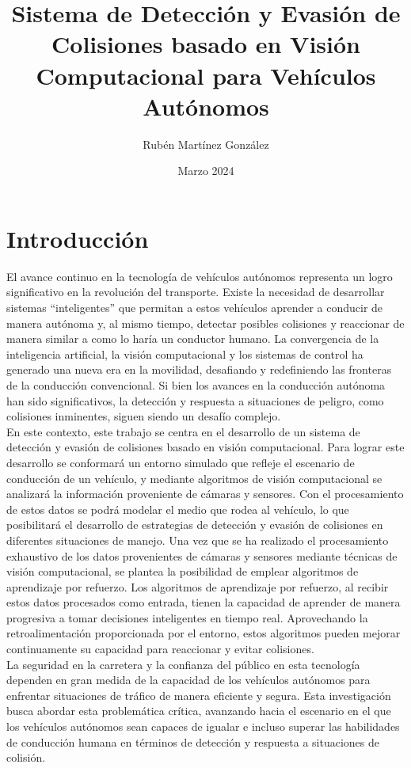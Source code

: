 \documentclass[12pt,letterpaper,final]{article}
\title{Sistema de Detección y Evasión de Colisiones basado en Visión Computacional para Vehículos Autónomos}
\author{Rubén Martínez González}
\date{Marzo 2024}
\begin{document}
    \maketitle
    \clearpage

    \section*{Introducción}
    \noindent
    El avance continuo en la tecnología de vehículos autónomos representa un logro significativo en la revolución del transporte.
    Existe la necesidad de desarrollar sistemas ``inteligentes'' que permitan a estos vehículos aprender a conducir de manera autónoma y,
    al mismo tiempo, detectar posibles colisiones y reaccionar de manera similar a como lo haría un conductor humano.
    La convergencia de la inteligencia artificial, la visión computacional y los sistemas de control ha generado una nueva era en la movilidad,
    desafiando y redefiniendo las fronteras de la conducción convencional.
    Si bien los avances en la conducción autónoma han sido significativos, la detección y respuesta a
    situaciones de peligro, como colisiones inminentes, siguen siendo un desafío complejo.\\ \newline
    En este contexto, este trabajo se centra en el desarrollo de un sistema de detección y evasión de colisiones basado en visión computacional.
    Para lograr este desarrollo se conformará un entorno simulado que refleje el escenario de conducción de un vehículo,
    y mediante algoritmos de visión computacional se analizará la información proveniente de cámaras y sensores.
    Con el procesamiento de estos datos se podrá modelar el medio que rodea al vehículo, lo que posibilitará
    el desarrollo de estrategias de detección y evasión de colisiones en diferentes situaciones de manejo.
    Una vez que se ha realizado el procesamiento exhaustivo de los datos provenientes de cámaras y sensores mediante técnicas de visión computacional,
    se plantea la posibilidad de emplear algoritmos de aprendizaje por refuerzo.
    Los algoritmos de aprendizaje por refuerzo, al recibir estos datos procesados como entrada, tienen la capacidad de aprender de manera progresiva
    a tomar decisiones inteligentes en tiempo real.
    Aprovechando la retroalimentación proporcionada por el entorno, estos algoritmos pueden mejorar continuamente su capacidad para reaccionar y evitar colisiones.\\ \newline
    La seguridad en la carretera y la confianza del público en esta tecnología dependen en gran medida de la capacidad
    de los vehículos autónomos para enfrentar situaciones de tráfico de manera eficiente y segura.
    Esta investigación busca abordar esta problemática crítica, avanzando hacia el escenario en el que los vehículos autónomos
    sean capaces de igualar e incluso superar las habilidades de conducción humana en términos de detección y respuesta
    a situaciones de colisión.
    \clearpage
    
\end{document}
